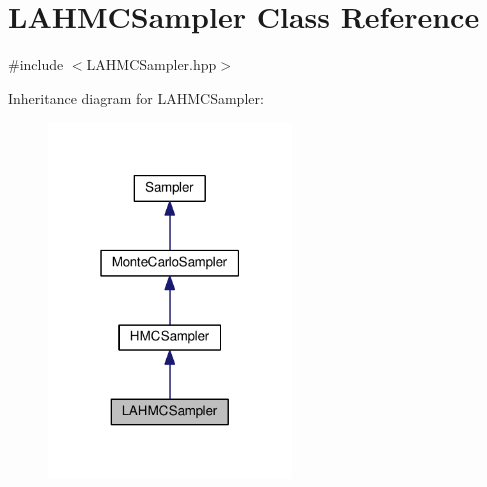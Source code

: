 \hypertarget{classLAHMCSampler}{}\section{L\+A\+H\+M\+C\+Sampler Class Reference}
\label{classLAHMCSampler}


{\ttfamily \#include $<$L\+A\+H\+M\+C\+Sampler.\+hpp$>$}



Inheritance diagram for L\+A\+H\+M\+C\+Sampler\+:\nopagebreak
\begin{figure}[H]
\begin{center}
\leavevmode
\includegraphics[width=183pt]{classLAHMCSampler__inherit__graph}
\end{center}
\end{figure}


